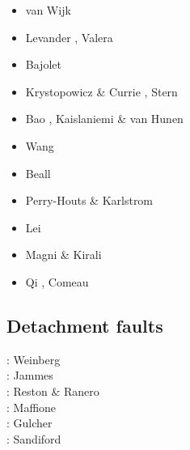 \begin{scriptsize}
\begin{itemize}
\item[\twothousandten] van Wijk \etal \cite{vabv10}
\item[\twothousandeleven] Levander \etal \cite{lesm11}, Valera \etal \cite{vanj11}
\item[\twothousandtwelve] Bajolet \etal \cite{bagf12}
\item[\twothousandthirteen] Krystopowicz \& Currie \cite{krcu13}, Stern \etal \cite{sths13}
\item[\twothousandfourteen] Bao \etal \cite{baeg14}, Kaislaniemi \& van Hunen \cite{kava14}
\item[\twothousandfifteen] Wang \etal \cite{wahz15}
\item[\twothousandseventeen] Beall \etal \cite{bems17}
\item[\twothousandeighteen] Perry-Houts \& Karlstrom \cite{peka18}
\item[\twothousandnineteen] Lei \etal \cite{lell19}
\item[\twothousandtwenty] Magni \& Kirali \cite{maki20}
\item[\twothousandtwentyone] Qi \etal \cite{qizx21}, Comeau \etal \cite{cosb21}
\end{itemize}
\end{scriptsize}


\subsection{Detachment faults} 

\begin{scriptsize}
\twothousandseven: Weinberg \etal \cite{werr07}\\
\twothousandten: Jammes \etal \cite{jaml10}\\
\twothousandeleven: Reston \& Ranero \cite{rera11}\\
\twothousandfifteen: Maffione \etal \cite{matv15}\\
\twothousandnineteen: Gulcher \etal \cite{gubg19}\\
\twothousandtwentyone: Sandiford \etal \cite{sabg21}
\end{scriptsize}

